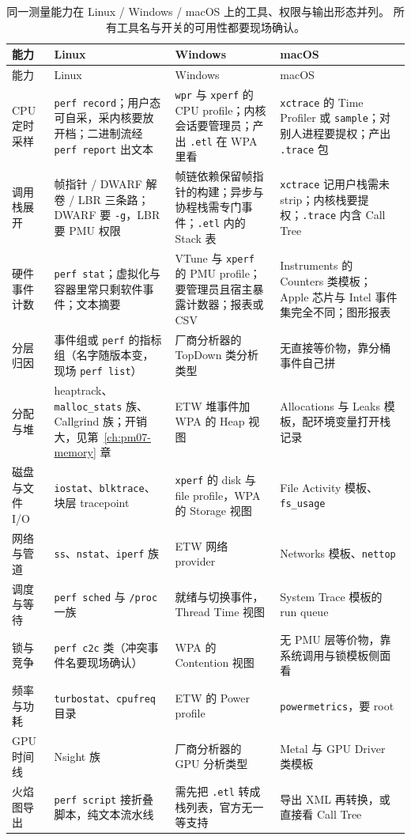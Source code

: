 \documentclass[12pt,a4paper,fontset=fandol]{ctexbook}
\newcommand{\Tp}[1]{\texttt{#1}}
\begin{document}
\begin{longtable}{>{\raggedright\arraybackslash}p{}
                  >{\raggedright\arraybackslash}p{}
                  >{\raggedright\arraybackslash}p{}
                  >{\raggedright\arraybackslash}p{}}
\caption{\label{tab:pmapA-tool}同一测量能力在 Linux / Windows / macOS 上的工具、权限与输出形态并列。
所有工具名与开关的可用性都要现场确认。}\\
能力 & Linux & Windows & macOS \\
\hline
\endfirsthead
\hline
能力 & Linux & Windows & macOS \\
\hline
\endhead
CPU 定时采样 & \Tp{perf record}；用户态可自采，采内核要放开档；二进制流经 \Tp{perf report} 出文本 &
\Tp{wpr} 与 \Tp{xperf} 的 CPU profile；内核会话要管理员；产出 \Tp{.etl} 在 WPA 里看 &
\Tp{xctrace} 的 Time Profiler 或 \Tp{sample}；对别人进程要提权；产出 \Tp{.trace} 包 \\
\hline
调用栈展开 & 帧指针 / DWARF 解卷 / LBR 三条路；DWARF 要 \Tp{-g}，LBR 要 PMU 权限 &
帧链依赖保留帧指针的构建；异步与协程栈需专门事件；\Tp{.etl} 内的 Stack 表 &
\Tp{xctrace} 记用户栈需未 strip；内核栈要提权；\Tp{.trace} 内含 Call Tree \\
\hline
硬件事件计数 & \Tp{perf stat}；虚拟化与容器里常只剩软件事件；文本摘要 &
VTune 与 \Tp{xperf} 的 PMU profile；要管理员且宿主暴露计数器；报表或 CSV &
Instruments 的 Counters 类模板；Apple 芯片与 Intel 事件集完全不同；图形报表 \\
\hline
分层归因 & 事件组或 \Tp{perf} 的指标组（名字随版本变，现场 \Tp{perf list}） &
厂商分析器的 TopDown 类分析类型 & 无直接等价物，靠分桶事件自己拼 \\
\hline
分配与堆 & heaptrack、\Tp{malloc\_stats} 族、Callgrind 族；开销大，见第~\ref{ch:pm07-memory} 章 &
ETW 堆事件加 WPA 的 Heap 视图 & Allocations 与 Leaks 模板，配环境变量打开栈记录 \\
\hline
磁盘与文件 I/O & \Tp{iostat}、\Tp{blktrace}、块层 tracepoint &
\Tp{xperf} 的 disk 与 file profile，WPA 的 Storage 视图 & File Activity 模板、\Tp{fs\_usage} \\
\hline
网络与管道 & \Tp{ss}、\Tp{nstat}、\Tp{iperf} 族 & ETW 网络 provider & Networks 模板、\Tp{nettop} \\
\hline
调度与等待 & \Tp{perf sched} 与 \Tp{/proc} 一族 & 就绪与切换事件，Thread Time 视图 &
System Trace 模板的 run queue \\
\hline
锁与竞争 & \Tp{perf c2c} 类（冲突事件名要现场确认） & WPA 的 Contention 视图 &
无 PMU 层等价物，靠系统调用与锁模板侧面看 \\
\hline
频率与功耗 & \Tp{turbostat}、\Tp{cpufreq} 目录 & ETW 的 Power profile & \Tp{powermetrics}，要 root \\
\hline
GPU 时间线 & Nsight 族 & 厂商分析器的 GPU 分析类型 & Metal 与 GPU Driver 类模板 \\
\hline
火焰图导出 & \Tp{perf script} 接折叠脚本，纯文本流水线 &
需先把 \Tp{.etl} 转成栈列表，官方无一等支持 & 导出 XML 再转换，或直接看 Call Tree \\
\hline
\end{longtable}
\end{document}
